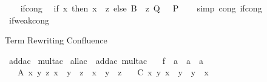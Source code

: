\begin{isabellebody}
\ \ \isamarkupfalse%
%
\endisatagproof
{\isafoldproof}%
%
\isadelimproof
\isanewline
%
\endisadelimproof
\isanewline
{}\isamarkupfalse%
\ if{\isacharunderscore}{\kern0pt}cong\isanewline
\isanewline
{}\isamarkupfalse%
\ {\isachardoublequoteopen}{\isasymlbrakk}\ {\isacharparenleft}{\kern0pt}if\ x\ then\ x\ {\isasymlongrightarrow}\ z\ else\ B{\isacharparenright}{\kern0pt}\ {\isacharequal}{\kern0pt}\ z{\isacharsemicolon}{\kern0pt}\ Q\ {\isasymrbrakk}\ {\isasymLongrightarrow}\ P{\isachardoublequoteclose}\isanewline
%
\isadelimproof
\ \ %
\endisadelimproof
%
\isatagproof
{}\isamarkupfalse%
\ {\isacharparenleft}{\kern0pt}simp\ cong{\isacharcolon}{\kern0pt}\ if{\isacharunderscore}{\kern0pt}cong{\isacharparenright}{\kern0pt}\isanewline
\ \ \isamarkupfalse%
%
\endisatagproof
{\isafoldproof}%
%
\isadelimproof
\isanewline
%
\endisadelimproof
\isanewline
{}\isamarkupfalse%
\ if{\isacharunderscore}{\kern0pt}weak{\isacharunderscore}{\kern0pt}cong%
\begin{isamarkuptext}%
Term Rewriting Confluence%
\end{isamarkuptext}\isamarkuptrue%
\isamarkupfalse%
\ add{\isacharunderscore}{\kern0pt}ac\isanewline
{}\isamarkupfalse%
\ mult{\isacharunderscore}{\kern0pt}ac\isanewline
\isanewline
{}\isamarkupfalse%
\ all{\isacharunderscore}{\kern0pt}ac\ {\isacharequal}{\kern0pt}\ add{\isacharunderscore}{\kern0pt}ac\ mult{\isacharunderscore}{\kern0pt}ac\isanewline
{}\isamarkupfalse%
\isanewline
\isanewline
{}\isamarkupfalse%
\isanewline
\ \ \ f\ {\isacharcolon}{\kern0pt}{\isacharcolon}{\kern0pt}\ {\isachardoublequoteopen}{\isacharprime}{\kern0pt}a\ {\isasymRightarrow}\ {\isacharprime}{\kern0pt}a\ {\isasymRightarrow}\ {\isacharprime}{\kern0pt}a{\isachardoublequoteclose}\ {\isacharparenleft}{\kern0pt}\ {\isachardoublequoteopen}{\isasymodot}{\isachardoublequoteclose}\ {}{}{\isacharparenright}{\kern0pt}\isanewline
\ \ \ A{\isacharcolon}{\kern0pt}\ {\isachardoublequoteopen}{\isasymAnd}x\ y\ z{\isachardot}{\kern0pt}\ {\isacharparenleft}{\kern0pt}x\ {\isasymodot}\ y{\isacharparenright}{\kern0pt}\ {\isasymodot}\ z\ {\isacharequal}{\kern0pt}\ x\ {\isasymodot}\ {\isacharparenleft}{\kern0pt}y\ {\isasymodot}\ z{\isacharparenright}{\kern0pt}{\isachardoublequoteclose}\isanewline
\ \ \ C{\isacharcolon}{\kern0pt}\ {\isachardoublequoteopen}{\isasymAnd}x\ y{\isachardot}{\kern0pt}\ x\ {\isasymodot}\ y\ {\isacharequal}{\kern0pt}\ y\ {\isasymodot}\ x{\isachardoublequoteclose}\isanewline

\end{isabellebody}
